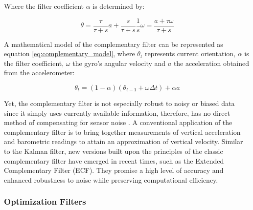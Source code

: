 Where the filter coefficient $\alpha$ is determined by:

\begin{equation}
    \theta = \frac{\tau}{\tau + s}a + \frac{s}{\tau + s}\frac{1}{s}\omega = \frac{a+\tau \omega}{\tau + s}
\end{equation}

A mathematical model of the complementary filter can be represented as equation \ref{eq:complementary_model}, where $\theta_t$ represents current orientation, $\alpha$ is the filter coefficient, $\omega$ the gyro's angular velocity and $a$ the acceleration obtained from the accelerometer:

\begin{equation}
    \theta_t = (1 - \alpha) (\theta_{t-1} + \omega \Delta t) + \alpha a
    \label{eq:complementary_model}
\end{equation}

Yet, the complementary filter is not especially robust to noisy or biased data since it simply uses currently available information, therefore, has no direct method of compensating for sensor noise \cite{wilson2019formulation}. A conventional application of the complementary filter is to bring together measurements of vertical acceleration and barometric readings to attain an approximation of vertical velocity. Similar to the Kalman filter, new versions built upon the principles of the classic complementary filter have emerged in recent times, such as the Extended Complementary Filter (ECF). They promise a high level of accuracy and enhanced robustness to noise while preserving computational efficiency.


\subsubsection{Optimization Filters}

